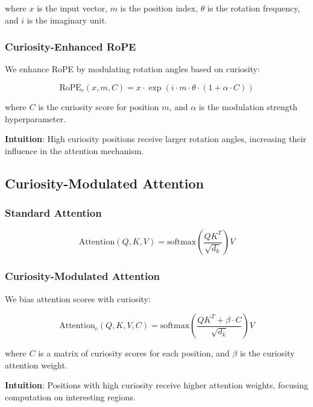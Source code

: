 \documentclass{IEEEtran}
\begin{document}
where $x$ is the input vector, $m$ is the position index, $\theta$ is the rotation frequency, and $i$ is the imaginary unit.

\subsubsection{Curiosity-Enhanced RoPE}

We enhance RoPE by modulating rotation angles based on curiosity:

\begin{equation}
\text{RoPE}_c(x, m, C) = x \cdot \exp(i \cdot m \cdot \theta \cdot (1 + \alpha \cdot C))
\end{equation}

where $C$ is the curiosity score for position $m$, and $\alpha$ is the modulation strength hyperparameter.

\textbf{Intuition}: High curiosity positions receive larger rotation angles, increasing their influence in the attention mechanism.

\subsection{Curiosity-Modulated Attention}

\subsubsection{Standard Attention}

\begin{equation}
\text{Attention}(Q, K, V) = \text{softmax}\left(\frac{QK^T}{\sqrt{d_k}}\right) V
\end{equation}

\subsubsection{Curiosity-Modulated Attention}

We bias attention scores with curiosity:

\begin{equation}
\text{Attention}_c(Q, K, V, C) = \text{softmax}\left(\frac{QK^T + \beta \cdot C}{\sqrt{d_k}}\right) V
\end{equation}

where $C$ is a matrix of curiosity scores for each position, and $\beta$ is the curiosity attention weight.

\textbf{Intuition}: Positions with high curiosity receive higher attention weights, focusing computation on interesting regions.
\end{document}
